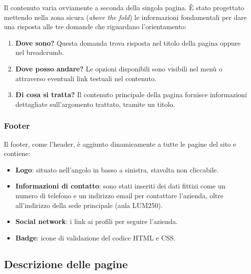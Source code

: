 \documentclass[a4paper, 12pt]{article}
\begin{document}
\begin{justify}
Il contenuto varia ovviamente a seconda della singola pagina. È stato progettato mettendo nella zona sicura (\textit{above the fold}) le informazioni fondamentali per dare una risposta alle tre domande che riguardano l'orientamento:
\begin{enumerate}
    \item \textbf{Dove sono?} Questa domanda trova risposta nel titolo della pagina oppure nel breadcrumb.
    \item \textbf{Dove posso andare?} Le opzioni disponibili sono visibili nel menù o attraverso eventuali link testuali nel contenuto.
    \item \textbf{Di cosa si tratta?} Il contenuto principale della pagina fornisce informazioni dettagliate sull'argomento trattato, tramite un titolo.
\end{enumerate}

\subsubsection{Footer}

Il footer, come l'header, è aggiunto dinamicamente a tutte le pagine del sito e contiene:
\begin{itemize}
    \item \textbf{Logo}: situato nell'angolo in basso a sinistra, stavolta non cliccabile.
    \item \textbf{Informazioni di contatto}: sono stati inseriti dei dati fittizi come un numero di telefono e un indirizzo email per contattare l'azienda, oltre all'indirizzo della sede principale (aula LUM250).
    \item \textbf{Social network}: i link ai profili per seguire l'azienda.
    \item \textbf{Badge}: icone di validazione del codice HTML e CSS.
\end{itemize}

\subsection{Descrizione delle pagine}


\end{justify}
\end{document}
